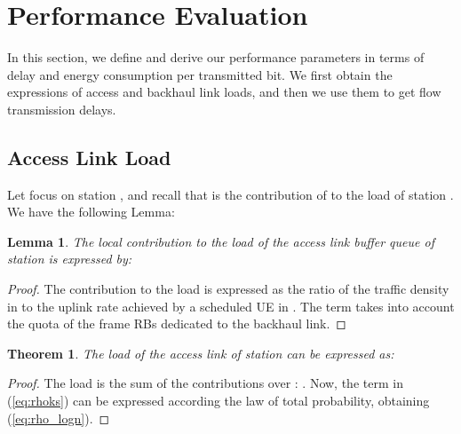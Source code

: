 \documentclass[draftcls,onecolumn]{IEEEtran}
\theoremstyle{plain}
\newtheorem{lemma}{Lemma}
\newtheorem{theorem}{Theorem}
\theoremstyle{definition}
\def\st{\mbox{ s.t. }} \def\ie{\mbox{\em i.e., }} \def\wrt{\mbox{\em wrt. }}
\def\st{\mbox{ s.t. }} \def\ie{\mbox{\em i.e., }}
\def\ra{\rightarrow}
\def\bbbone{{\mathchoice {\rm 1\mskip-4mu l} {\rm 1\mskip-4mu l} {\rm
1\mskip-4.5mu l} {\rm 1\mskip-5mu l}}}
\def\charact{\bbbone}
\def\dsp{\displaystyle}
\def\cond{\ |\ }
\begin{document}
 
\section{Performance Evaluation} \label{perf_eval}



\def\dsp{\displaystyle}

\def\ie{\mbox{ {\em i.e.} }} \def\st{\mbox{ {\em s.t.} }} 

\def\st{\mbox{ s.t. }} \def\resp{\mbox{resp.~}}

\def\Demo{\mbox{\em{Proof: }}}
\def\QED{\ \ \hfill QED \enspace.}
\def\ra{\rightarrow}
\def\Ra{\Rightarrow}
\def\lra{\leftrightarrow}
\def\Lra{\Leftrightarrow}
\def\cond{\ |\ }
\def\Xt{X^t}
\def\alphait{\alpha_i(t)}
\def\alphajt{\boldsymbol{\alpha}_{-i}(t)}
\def\Pt{\mathbb{P}_{\boldsymbol{\alpha}}}
\def\alphai{\alpha_i}
\def\alphaj{\boldsymbol{\alpha}_{-i}}
\def\ui{u_i}
\def\uj{\boldsymbol{u_j}}
\newcommand{\bbbe}{{\mathbb{E}}} 
\def\bbbone{{\mathchoice {\rm 1\mskip-4mu l} {\rm 1\mskip-4mu l} {\rm
1\mskip-4.5mu l} {\rm 1\mskip-5mu l}}} 
\def\charact#1{\bbbone_{#1}} \def\Esp#1{\bbbe\, \left[\, {#1} \, \right]} \def\Espt#1{\bbbe_{\boldsymbol{\alpha}}\, \left[\, {#1} \,\right]} \def\Esptt#1#2{\Espt{#2}} 


In this section, we define and derive our performance parameters in terms of delay and energy consumption per transmitted bit. We first obtain the expressions of access and backhaul link loads, and then we use them to get flow transmission delays. 

\subsection{Access Link Load} \label{subsec:accessload}


Let focus on station , and recall that  is the contribution of  to the load  of station . 
We have the following Lemma:
\begin{lemma}
The local contribution  to the load of the access link buffer queue of station  is expressed by:

\end{lemma} 
\begin{proof}
The contribution to the load is expressed as the ratio of the traffic density  in  to the uplink rate achieved by a scheduled UE in . The term  takes into account the quota of the frame RBs dedicated to the backhaul link.  
\end{proof}

\begin{theorem} \label{th:rho}
The load  of the access link of station  can be expressed as:

\end{theorem}
\begin{proof}
The load  is the sum of the contributions  over : 
. Now, the term  in (\ref{eq:rhoks}) can be expressed according the law of total probability, obtaining (\ref{eq:rho_logn}).
\end{proof}
\end{document}

